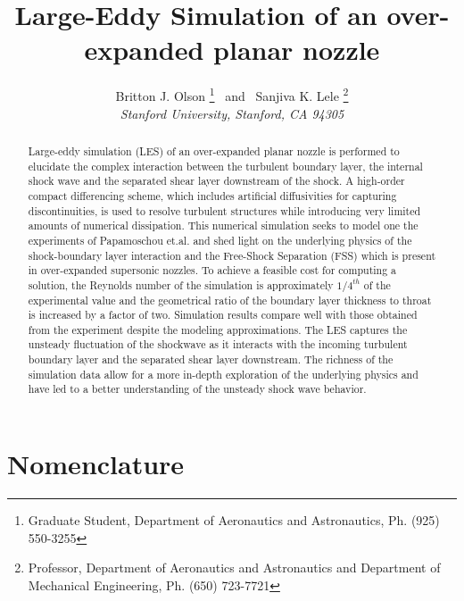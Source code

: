 \documentclass[]{aiaa-tc}%
\title{Large-Eddy Simulation of an over-expanded planar nozzle}
\author{
 	Britton J. Olson
    \thanks{Graduate Student, Department of Aeronautics and Astronautics, Ph. (925) 550-3255} \  and 
  \ Sanjiva K. Lele 
  \thanks{Professor, Department of Aeronautics and Astronautics and Department of Mechanical Engineering, Ph. (650) 723-7721}\\
  {\normalsize\itshape
   Stanford University, Stanford, CA 94305}
 }
\begin{document}
\maketitle

\begin{abstract}



Large-eddy simulation (LES) of an over-expanded planar nozzle is performed to elucidate the complex interaction between the turbulent boundary layer, the internal shock wave and the separated shear layer downstream of the shock.  A high-order compact differencing scheme, which includes artificial diffusivities for capturing discontinuities, is used to resolve turbulent structures while introducing very limited amounts of numerical dissipation.   This numerical simulation seeks to model one the experiments of Papamoschou et.al. and shed light on the underlying physics of the shock-boundary layer interaction and the Free-Shock Separation (FSS) which is present in over-expanded supersonic nozzles.  To achieve a feasible cost for computing a solution, the Reynolds number of the simulation is approximately $1/4^{th}$ of the experimental value and the geometrical ratio of the boundary layer thickness to throat is increased by a factor of two.  Simulation results compare well with those obtained from the experiment despite the modeling approximations.  The LES captures the unsteady fluctuation of the shockwave as it interacts with the incoming turbulent boundary layer and the separated shear layer downstream.  The richness of the simulation data allow for a more in-depth exploration of the underlying physics and have led to a better understanding of the unsteady shock wave behavior. 
\end{abstract}




\section*{Nomenclature}
\end{document}
